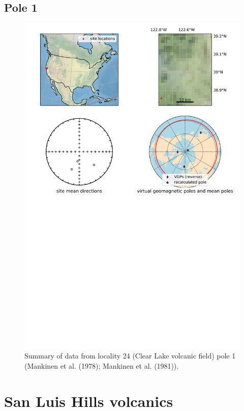 \subsection{Pole 1}


\begin{figure}[H]
\centering
\includegraphics[width=5 in]{./24/1/pole_summary.png}
\caption{Summary of data from locality 24 (Clear Lake volcanic field) pole 1 (Mankinen et al. (1978); Mankinen et al. (1981)).}
\end{figure}

\section{San Luis Hills volcanics}
